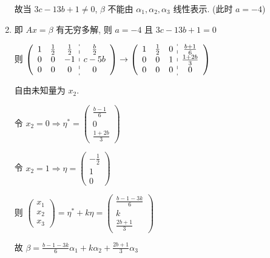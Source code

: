 \begin{enumerate}
                   故当 \( 3c-13b+1 \neq 0 \), \( \beta \) 不能由 \( \alpha_{1}, \alpha_{2}, \alpha_{3} \) 线性表示. (此时 \( a = -4 \))
             \item %
                   即 \( Ax = \beta \) 有无穷多解, 则 \( a = -4 \) 且 \( 3c-13b+1 = 0 \)

                   则 \( \left(\begin{array}{ccc:c}
                           1 & \frac{1}{2} & \frac{1}{2} & \frac{b}{2} \\
                           0 & 0           & -1          & c-5b        \\
                           0 & 0           & 0           & 0
                       \end{array}\right) \rightarrow \left(\begin{array}{ccc:c}
                           1 & \frac{1}{2} & 0 & \frac{b+1}{6}  \\
                           0 & 0           & 1 & \frac{1+2b}{3} \\
                           0 & 0           & 0 & 0
                       \end{array}\right) \)

                   自由未知量为 \( x_{2} \).

                   令 \( x_{2} = 0 \Rightarrow \eta^{*} = \begin{pmatrix}
                       \frac{b-1}{6} \\
                       0             \\
                       \frac{1+2b}{3}
                   \end{pmatrix} \)

                   令 \( x_{2} = 1 \Rightarrow \eta = \begin{pmatrix}
                       -\frac{1}{2} \\
                       1            \\
                       0
                   \end{pmatrix} \)

                   则 \( \begin{pmatrix}
                       x_{1} \\
                       x_{2} \\
                       x_{3}
                   \end{pmatrix} = \eta^{*} + k\eta = \begin{pmatrix}
                       \frac{b-1-3k}{6} \\
                       k                \\
                       \frac{2b+1}{3}
                   \end{pmatrix} \)

                   故 \( \beta = \frac{b-1-3k}{6}\alpha_{1} + k\alpha_{2} + \frac{2b+1}{3}\alpha_{3} \)
         \end{enumerate}


